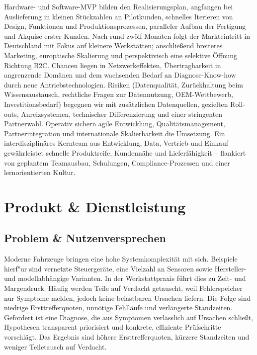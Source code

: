 \newline\newline
Hardware- und Software-\ac{MVP} bilden den Realisierungsplan, angfangen bei Auslieferung in kleinen Stückzahlen an Pilotkunden, schnelles Iterieren von Design, Funktionen und Produktionsprozessen, paralleler Aufbau der Fertigung und Akquise erster Kunden. Nach rund zwölf Monaten folgt der Markteintritt in Deutschland mit Fokus auf kleinere Werkstätten; anschließend breiteres Marketing, europäische Skalierung und perspektivisch eine selektive Öffnung Richtung \ac{B2C}. Chancen liegen in Netzwerkeffekten, Übertragbarkeit in angrenzende Domänen und dem wachsenden Bedarf an Diagnose-Know-how durch neue Antriebstechnologien. Risiken (Datenqualität, Zurückhaltung beim Wissensaustausch, rechtliche Fragen zur Datennutzung, \ac{OEM}-Wettbewerb, Investitionsbedarf) begegnen wir mit zusätzlichen Datenquellen, gezielten Roll-outs, Anreizsystemen, technischer Differenzierung und einer stringenten Partnerwahl. Operativ sichern agile Entwicklung, Qualitätsmanagement, Partnerintegration und internationale Skalierbarkeit die Umsetzung. Ein interdisziplinäres Kernteam aus Entwicklung, Data, Vertrieb und Einkauf gewährleistet schnelle Produktreife, Kundennähe und Lieferfähigkeit – flankiert von geplantem Teamausbau, Schulungen, Compliance-Prozessen und einer lernorientierten Kultur.
\newpage
\section{Produkt \& Dienstleistung}
\label{sec:produkt}

\subsection{Problem \& Nutzenversprechen}
Moderne Fahrzeuge bringen eine hohe Systemkomplexität mit sich. Beispiele hierf"ur sind vernetzte Steuergeräte, eine Vielzahl an Sensoren sowie Hersteller- und modellabhängige Varianten. In der Werkstattpraxis führt dies zu Zeit- und Margendruck. Häufig werden Teile auf Verdacht getauscht, weil Fehlerspeicher nur Symptome melden, jedoch keine belastbaren Ursachen liefern. Die Folge sind niedrige Ersttrefferquoten, unnötige Fehlläufe und verlängerte Standzeiten. Gefordert ist eine Diagnose, die aus Symptomen verlässlich auf Ursachen schließt, Hypothesen transparent priorisiert und konkrete, effiziente Prüfschritte vorschlägt. Das Ergebnis sind höhere Ersttrefferquoten, kürzere Standzeiten und weniger Teiletausch auf Verdacht.

